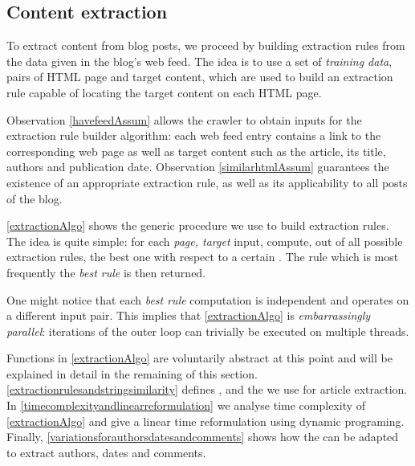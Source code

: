 \subsection{Content extraction}
\label{contentextraction}

To extract content from blog posts, we proceed by building extraction rules from the data given in the blog's web feed. The idea is to use a set of \emph{training data}, pairs of HTML page and target content, which are used to build an extraction rule capable of locating the target content on each HTML page.

Observation \ref{havefeedAssum} allows the crawler to obtain inputs for the extraction rule builder algorithm: each web feed entry contains a link to the corresponding web page as well as target content such as the article, its title, authors and publication date. Observation \ref{similarhtmlAssum} guarantees the existence of an appropriate extraction rule, as well as its applicability to all posts of the blog.

\autoref{extractionAlgo} shows the generic procedure we use to build extraction rules. The idea is quite simple: for each \code{(}\emph{page, target}\code{)} input, compute, out of all possible extraction rules, the best one with respect to a certain . The rule which is most frequently the \emph{best rule} is then returned.

\extractionAlgo

One might notice that each \emph{best rule} computation is independent and operates on a different input pair. This implies that \autoref{extractionAlgo} is \emph{embarrassingly parallel}: iterations of the outer loop can trivially be executed on multiple threads.

Functions in \autoref{extractionAlgo} are voluntarily abstract at this point and will be explained in detail in the remaining of this section. \ref{extractionrulesandstringsimilarity} defines ,  and the  we use for article extraction. In \ref{timecomplexityandlinearreformulation} we analyse time complexity of \autoref{extractionAlgo} and give a linear time reformulation using dynamic programing. Finally, \ref{variationsforauthorsdatesandcomments} shows how the  can be adapted to extract authors, dates and comments.

